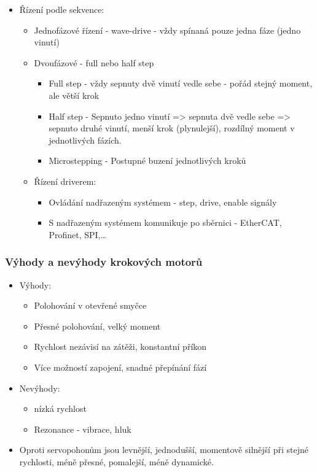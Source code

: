 \begin{itemize}
    \item Řízení podle sekvence: \begin{itemize}
              \item Jednofázové řízení - wave-drive - vždy spínaná pouze jedna fáze (jedno vinutí)
              \item Dvoufázové - full nebo half step\begin{itemize}
                        \item Full step - vždy sepnuty dvě vinutí vedle sebe - pořád stejný moment, ale větší krok
                        \item Half step - Sepnuto jedno vinutí => sepnuta dvě vedle sebe => sepnuto druhé vinutí, menší krok (plynulejší), rozdílný moment v jednotlivých fázích.
                        \item Microstepping - Postupné buzení jednotlivých kroků
                    \end{itemize}
              \item Řízení driverem: \begin{itemize}
                        \item Ovládání nadřazeným systémem - step, drive, enable signály
                        \item S nadřazeným systémem komunikuje po sběrnici - EtherCAT, Profinet, SPI,\dots
                    \end{itemize}
          \end{itemize}
\end{itemize}

\subsubsection*{Výhody a nevýhody krokových motorů}
\begin{itemize}
    \item Výhody: \begin{itemize}
              \item Polohování v otevřené smyčce
              \item Přesné polohování, velký moment
              \item Rychlost nezávisí na zátěži, konstantní příkon
              \item Více možností zapojení, snadné přepínání fází
          \end{itemize}
    \item Nevýhody: \begin{itemize}
              \item nízká rychlost
              \item Rezonance - vibrace, hluk
          \end{itemize}
    \item Oproti servopohonům jsou levnější, jednodušší, momentově silnější při stejné rychlosti, méně přesné, pomalejší, méně dynamické.
\end{itemize}


